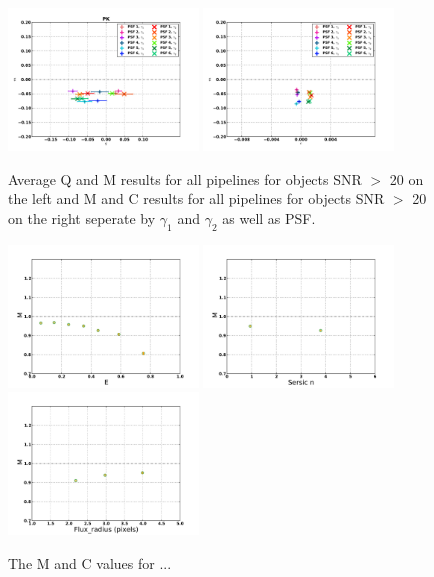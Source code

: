 \begin{figure}
\centering
\includegraphics[width=0.45\textwidth]{fig/QMC_main_PK_f.pdf} 
\includegraphics[width=0.45\textwidth]{fig/MC_main_PK_f.pdf} 
\caption{Average Q and M results for all pipelines for objects 
SNR $>$ 20 on the left and M and C results for all pipelines for objects 
SNR $>$ 20 on the right seperate by $\gamma_{1} $ and $\gamma_{2} $ as
well as PSF.}
\label{fig:PKSB_qmc}
\end{figure}

\begin{figure}
\centering
\includegraphics[width=0.45\textwidth]{fig/MvalePK.pdf} 
\includegraphics[width=0.45\textwidth]{fig/Mval_typePK.pdf} 
\includegraphics[width=0.45\textwidth]{fig/Mval_sizePK.pdf} 
\caption{The M and C values for ...}
\label{fig:DEIMOS_m}
\end{figure}

